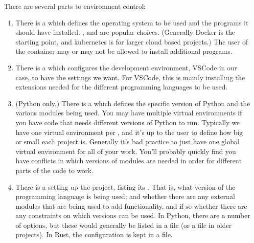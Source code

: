 \documentclass[letterpaper,10pt,british]{sphinxmanual}
\begin{document}
\sphinxAtStartPar
There are several parts to environment control:
\begin{enumerate}
%
\item {} 
\sphinxAtStartPar
There is a  which defines the operating system to be used and the programs it should have installed. ,   and  are popular choices. (Generally Docker is the starting point, and kubernetes is for larger cloud based projects.) The user of the container may or may not be allowed to install additional programs.

\item {} 
\sphinxAtStartPar
There is a  which configures the development environment, VSCode in our case, to have the settings we want. For VSCode, this is mainly installing the extensions needed for the different programming languages to be used.

\item {} 
\sphinxAtStartPar
(Python only.) There is a  which defines the specific version of Python and the various modules being used. You may have multiple virtual environments if you have code that needs different versions of Python to run. Typically we have one virtual environment per , and it’s up to the user to define how big or small each project is. Generally it’s bad practice to just have one global virtual environment for all of your work. You’ll probably quickly find you have conflicts in which versions of modules are needed in order for different parts of the code to work.

\item {} 
\sphinxAtStartPar
There is a  setting up the project, listing its . That is, what version of the programming language is being used; and whether there are any external modules that are being used to add functionality, and if so whether there are any constraints on which versions can be used. In Python, there are a number of options, but these would generally be listed in a  file (or a  file in older projects). In Rust, the configuration is kept in a  file.

\end{enumerate}
\end{document}

